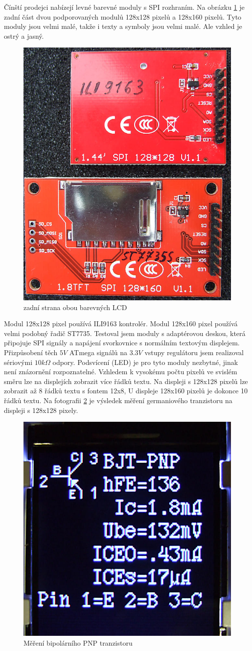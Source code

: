Čínští prodejci nabízejí levné barevné moduly s SPI rozhraním.
Na obrázku \ref{fig:Color_both} je zadní část dvou podporovaných modulů 128x128 pixelů
a 128x160 pixelů.
Tyto moduly jsou velmi malé, takže i texty a symboly jsou velmi malé.
Ale vzhled je ostrý a jasný.

\begin{figure}[H]
\centering
\includegraphics[width=.46\textwidth]{../PNG/Color_ILI9163_ST7735.jpg}
\caption{zadní strana obou barevných LCD}
\label{fig:Color_both}
\end{figure}

Modul 128x128 pixel používá ILI9163 kontrolér.
Modul 128x160 pixel používá velmi podobný řadič ST7735.
Testoval jsem moduly s adaptérovou deskou, která připojuje
SPI signály  a napájení svorkovnice s normálním textovým displejem.
Přizpůsobení těch \(5V\) ATmega signálů na \(3.3V\) vstupy regulátoru
jsem realizoval sériovými \(10k\Omega\) odpory.
Podsvícení (LED) je pro tyto moduly nezbytné, jinak není znázornění rozpoznatelné. 
Vzhledem k vysokému počtu pixelů ve svislém směru lze na displejích zobrazit více řádků textu.
Na displeji s 128x128 pixelů lze zobrazit až 8 řádků textu s fontem 12x8,
U displeje 128x160 pixelů je dokonce 10 řádků textu.
Na fotografii \ref{fig:Color_PNP} je výsledek měření germaniového tranzistoru na
displeji s 128x128 pixely.

\begin{figure}[H]
\centering
\includegraphics[width=.46\textwidth]{../PNG/Color_PNP_ILI9163.jpg}
\caption{Měření bipolárního PNP tranzistoru}
\label{fig:Color_PNP}
\end{figure}

